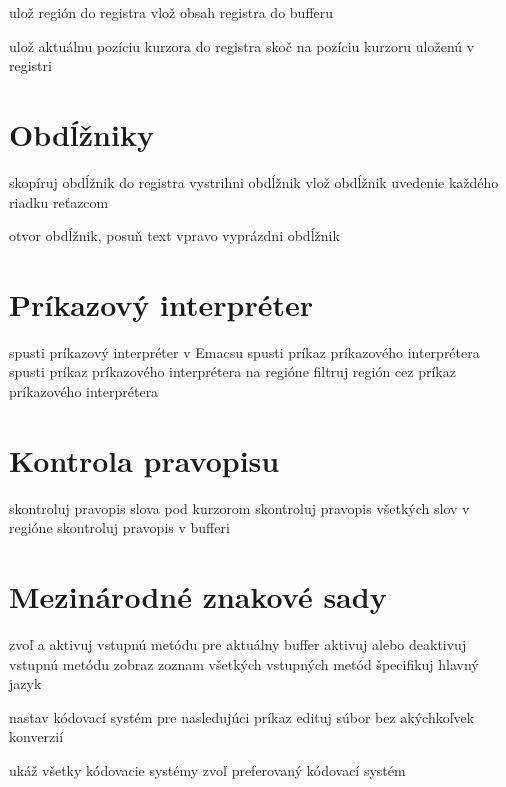  ulož región do registra
 vlož obsah registra do bufferu

 ulož aktuálnu pozíciu kurzora do registra
 skoč na pozíciu kurzoru uloženú v registri

\section{Obdĺžniky}

 skopíruj obdĺžnik do registra
 vystrihni obdĺžnik
 vlož obdĺžnik
 uvedenie každého riadku reťazcom

 otvor obdĺžnik, posuň text vpravo
 vyprázdni obdĺžnik

\section{Príkazový interpréter}

 spusti príkazový interpréter v Emacsu
 spusti príkaz príkazového interprétera
 spusti príkaz príkazového interprétera na regióne
 filtruj región cez príkaz príkazového interprétera

\section{Kontrola pravopisu}

 skontroluj pravopis slova pod kurzorom
 skontroluj pravopis všetkých slov v regióne
 skontroluj pravopis v bufferi

\section{Mezinárodné znakové sady}

 zvoľ a aktivuj vstupnú metódu pre aktuálny buffer
 aktivuj alebo deaktivuj vstupnú metódu
 zobraz zoznam všetkých vstupných metód
 špecifikuj hlavný jazyk

 nastav kódovací systém pre nasledujúci príkaz
 edituj súbor bez akýchkoľvek konverzií

 ukáž všetky kódovacie systémy
 zvoľ preferovaný kódovací systém

